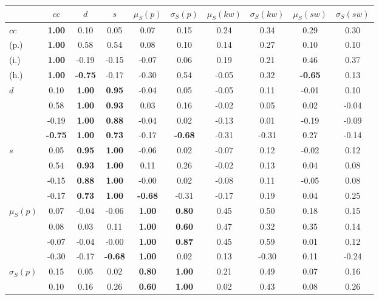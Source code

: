 \begin{table*}[h!]
\begin{center}
\begin{tabular}{| l || c | c | c | c | c | c | c | c | c |}\hline
 & $cc$ & $d$ & $s$ & $\mu_S(p)$ & $\sigma_S(p)$ & $\mu_S(kw)$ & $\sigma_S(kw)$ & $\mu_S(sw)$ & $\sigma_S(sw)$ \\\hline\hline
$cc$ & {\bf 1.00} & 0.10 & 0.05 & 0.07 & 0.15 & 0.24 & 0.34 & 0.29 & 0.30 \\
(p.) & {\bf 1.00} & 0.58 & 0.54 & 0.08 & 0.10 & 0.14 & 0.27 & 0.10 & 0.10 \\
(i.) & {\bf 1.00} & -0.19 & -0.15 & -0.07 & 0.06 & 0.19 & 0.21 & 0.46 & 0.37 \\
(h.) & {\bf 1.00} & {\bf -0.75} & -0.17 & -0.30 & 0.54 & -0.05 & 0.32 & {\bf -0.65} & 0.13 \\\hline
$d$ & 0.10 & {\bf 1.00} & {\bf 0.95} & -0.04 & 0.05 & -0.05 & 0.11 & -0.01 & 0.10 \\
 & 0.58 & {\bf 1.00} & {\bf 0.93} & 0.03 & 0.16 & -0.02 & 0.05 & 0.02 & -0.04 \\
 & -0.19 & {\bf 1.00} & {\bf 0.88} & -0.04 & 0.02 & -0.13 & 0.01 & -0.19 & -0.09 \\
 & {\bf -0.75} & {\bf 1.00} & {\bf 0.73} & -0.17 & {\bf -0.68} & -0.31 & -0.31 & 0.27 & -0.14 \\\hline
$s$ & 0.05 & {\bf 0.95} & {\bf 1.00} & -0.06 & 0.02 & -0.07 & 0.12 & -0.02 & 0.12 \\
 & 0.54 & {\bf 0.93} & {\bf 1.00} & 0.11 & 0.26 & -0.02 & 0.13 & 0.04 & 0.08 \\
 & -0.15 & {\bf 0.88} & {\bf 1.00} & -0.00 & 0.02 & -0.08 & 0.11 & -0.05 & 0.08 \\
 & -0.17 & {\bf 0.73} & {\bf 1.00} & {\bf -0.68} & -0.31 & -0.17 & 0.19 & 0.04 & 0.25 \\\hline
$\mu_S(p)$ & 0.07 & -0.04 & -0.06 & {\bf 1.00} & {\bf 0.80} & 0.45 & 0.50 & 0.18 & 0.15 \\
 & 0.08 & 0.03 & 0.11 & {\bf 1.00} & {\bf 0.60} & 0.47 & 0.32 & 0.35 & 0.14 \\
 & -0.07 & -0.04 & -0.00 & {\bf 1.00} & {\bf 0.87} & 0.45 & 0.59 & 0.01 & 0.12 \\
 & -0.30 & -0.17 & {\bf -0.68} & {\bf 1.00} & 0.02 & 0.13 & -0.30 & 0.11 & -0.24 \\\hline
$\sigma_S(p)$ & 0.15 & 0.05 & 0.02 & {\bf 0.80} & {\bf 1.00} & 0.21 & 0.49 & 0.07 & 0.16 \\
 & 0.10 & 0.16 & 0.26 & {\bf 0.60} & {\bf 1.00} & 0.02 & 0.43 & 0.08 & 0.26 \\

\end{tabular}
\end{center}
\end{table*}
